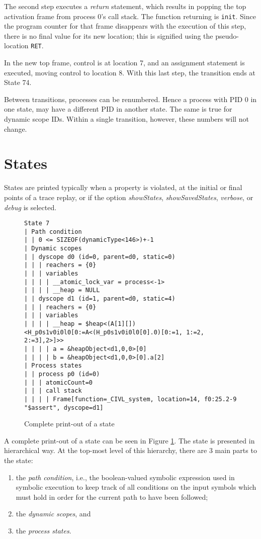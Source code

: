 The second step executes a \emph{return} statement, which results in
popping the top activation frame from process 0's call stack. The
function returning is \texttt{init}.  Since the program counter for
that frame disappears with the execution of this step, there is no
final value for its new location; this is signified using the
pseudo-location \texttt{RET}.

In the new top frame, control is at location 7, and an assignment
statement is executed, moving control to location 8.  With this last
step, the transition ends at State 74.

Between transitions, processes can be renumbered.  Hence a process
with PID 0 in one state, may have a different PID in another state.
The same is true for dynamic scope IDs.  Within a single transition,
however, these numbers will not change.

\section{States}

States are printed typically when a property is violated, at the
initial or final points of a trace replay, or if the option
\emph{showStates}, \emph{showSavedStates}, \emph{verbose}, or
\emph{debug} is selected.

\begin{figure}
  \begin{small}
\begin{verbatim}
State 7
| Path condition
| | 0 <= SIZEOF(dynamicType<146>)+-1
| Dynamic scopes
| | dyscope d0 (id=0, parent=d0, static=0)
| | | reachers = {0}
| | | variables
| | | | __atomic_lock_var = process<-1>
| | | | __heap = NULL
| | dyscope d1 (id=1, parent=d0, static=4)
| | | reachers = {0}
| | | variables
| | | | __heap = $heap<(A[1][])<H_p0s1v0i0l0[0:=A<(H_p0s1v0i0l0[0].0)[0:=1, 1:=2, 2:=3],2>]>>
| | | | a = &heapObject<d1,0,0>[0]
| | | | b = &heapObject<d1,0,0>[0].a[2]
| Process states
| | process p0 (id=0)
| | | atomicCount=0
| | | call stack
| | | | Frame[function=_CIVL_system, location=14, f0:25.2-9 "$assert", dyscope=d1]
\end{verbatim}
  \end{small}
  \caption{Complete print-out of a state}
  \label{fig:state-print}
\end{figure}

A complete print-out of a state can be seen in Figure
\ref{fig:state-print}.  The state is presented in hierarchical way.
At the top-most level of this hierarchy, there are 3 main parts to the
state:
\begin{enumerate}
\item the \emph{path condition}, i.e., the boolean-valued symbolic
  expression used in symbolic execution to keep track of all
  conditions on the input symbols which must hold in order for the
  current path to have been followed;
\item the \emph{dynamic scopes}, and
\item the \emph{process states}.
\end{enumerate}


